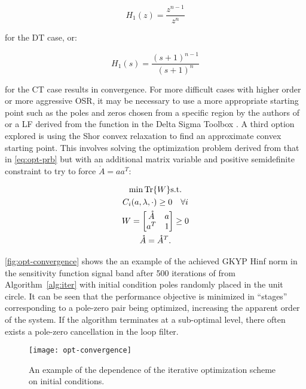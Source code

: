 \begin{equation*}
	H_1(z) = \frac{z^{n-1}}{z^{n}}
\end{equation*}

for the \gls{DT} case, or:

\begin{equation*}
	H_1(s) = \frac{(s + 1)^{n-1}}{(s + 1)^n}
\end{equation*}

for the \gls{CT} case results in convergence. For more difficult cases with higher order or more aggressive \gls{OSR}, it may be necessary to use a more appropriate starting point such as the poles and zeros chosen from a specific region by the authors of \cite[Fig. 2]{Li2014} or a \gls{LF} derived from the  function in the Delta Sigma Toolbox \cite[Appx. B]{Schreier1997}. A third option explored is using the Shor convex relaxation \cite{Boyd1997} to find an approximate convex starting point. This involves solving the optimization problem derived from that in \autoref{eq:opt-prb} but with an additional matrix variable and positive semidefinite constraint to try to force $\mathring{A} = aa^T$:

\begin{equation*}
	\begin{gathered}
		\min \operatorname{Tr}\{W\} \mathrm{ s.t.} \\
		C_i(a, \lambda, \cdot) \geq 0 \quad \forall i \\
		W = 
		\begin{bmatrix}
			\mathring{A} & a \\
			a^T & 1
		\end{bmatrix} \geq 0 \\
		\mathring{A} = \mathring{A}^T.
	\end{gathered}
\end{equation*}

\autoref{fig:opt-convergence} shows the an example of the achieved \gls{GKYP} \gls{Hinf} norm in the sensitivity function signal band after 500 iterations of   from Algorithm~\ref{alg:iter} with initial condition poles randomly placed in the unit circle. It can be seen that the performance objective is minimized in ``stages'' corresponding to a pole-zero pair being optimized, increasing the apparent order of the system. If the algorithm terminates at a sub-optimal level, there often exists a pole-zero cancellation in the loop filter.

\begin{figure}
	\centering
	\texttt{[image: opt-convergence]}
	\caption{An example of the dependence of the iterative optimization scheme on initial conditions.} \label{fig:opt-convergence}
\end{figure}